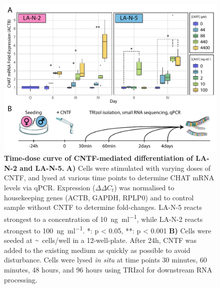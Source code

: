 \begin{figure}
\includegraphics[width=\textwidth]{figures/time-dose-timeline}
\caption[LA-N-2 and LA-N-5, Time-dose Curve and Differentiation Timeline.]{\textbf{Time-dose curve of CNTF-mediated differentiation of LA-N-2 and LA-N-5.} \textbf{A)} Cells were stimulated with varying doses of CNTF, and lysed at various time points to determine CHAT mRNA levels via qPCR. Expression ($\Delta\Delta{C}_t$) was normalised to housekeeping genes (ACTB, GAPDH, RPLP0) and to control sample without CNTF to determine fold-changes. LA-N-5 reacts strongest to a concentration of \SI{10}{\nano\gram\per\milli\litre}, while LA-N-2 reacts strongest to \SI{100}{\nano\gram\per\milli\litre}. *: p < 0.05, **: p < 0.001 \textbf{B)} Cells were seeded at $\smallsim$ cells/well in a 12-well-plate. After 24h, CNTF was added to the existing medium as quickly as possible to avoid disturbance. Cells were lysed \textit{in situ} at time points 30 minutes, 60 minutes, 48 hours, and 96 hours using TRIzol for downstream RNA processing.
\label{fig:time-dose-timeline}}
\end{figure}

